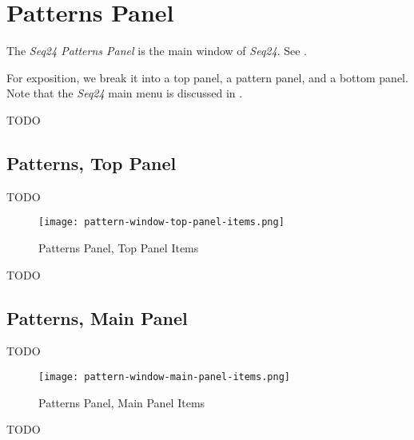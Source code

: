 %
%
%

\section{Patterns Panel}
\label{sec:seq24_patterns_panel}

   The \textsl{Seq24 Patterns Panel} is the main window of \textsl{Seq24}.
   See .

   For exposition, we break it into a top panel, a pattern panel, and a
   bottom panel.    Note that the \textsl{Seq24} main menu is discussed in
   .

   TODO

\subsection{Patterns, Top Panel}
\label{subsec:seq24_patterns_panel_top}

   TODO

\begin{figure}[H]
   \centering 
   \texttt{[image: pattern-window-top-panel-items.png]}
   \caption{Patterns Panel, Top Panel Items}
   \label{fig:pattern_window_top_panel_items}
\end{figure}

   TODO

\subsection{Patterns, Main Panel}
\label{subsec:seq24_patterns_panel_main}

   TODO

\begin{figure}[H]
   \centering 
   \texttt{[image: pattern-window-main-panel-items.png]}
   \caption{Patterns Panel, Main Panel Items}
   \label{fig:pattern_window_main_panel_items}
\end{figure}

   TODO

